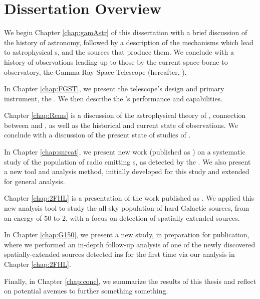\chapter{Dissertation Overview}
\label{chap:intro}

We begin Chapter \ref{chap:gamAstr} of this dissertation with a brief discussion of the history of \gam{} astronomy, followed by a description of the mechanisms which lead to astrophysical \gam{}s, and the sources that produce them. We conclude with a history of \gam{} observations leading up to those by the current space-borne\mev{} to \tev{} \gam{} observatory, the \Fermi{} Gamma-Ray Space Telescope (hereafter, \Fermi{}).

In Chapter \ref{chap:FGST}, we present the \Fermi{} telescope's design and primary instrument, the \lat{}. We then describe the \lat{}'s performance and capabilities. 

Chapter \ref{chap:Rems} is a discussion of the  astrophysical theory of \snrs{}, connection between \snrs{} and \crs{}, as well as the historical and current state of \snr{} observations. We conclude with a discussion of the present state of \gam{} studies of \snrs{}.

In Chapter \ref{chap:snrcat}, we present new work (published as \cite{snrCat}) on a systematic study of the population of radio \snrs{} emitting\gev{} \gam{}s, as detected by the \lat{}. We also present a new tool and analysis method, initially developed for this study and extended for general \lat{} analysis.

Chapter \ref{chap:2FHL} is a presentation of the  work published as \cite{2FHL}. We applied this new analysis tool to study the all-sky population of hard Galactic \gam{} sources, from an energy of 50\gev{} to 2\tev{}, with a focus on detection of spatially extended sources.

In Chapter \ref{chap:G150}, we present a new study, in preparation for publication, where we performed an in-depth follow-up analysis of one of the newly discovered spatially-extended sources detected in\gam{}s for the first time via our analysis in Chapter \ref{chap:2FHL}. 

Finally, in Chapter \ref{chap:conc}, we summarize the results of this thesis and reflect on potential avenues to further something something.




